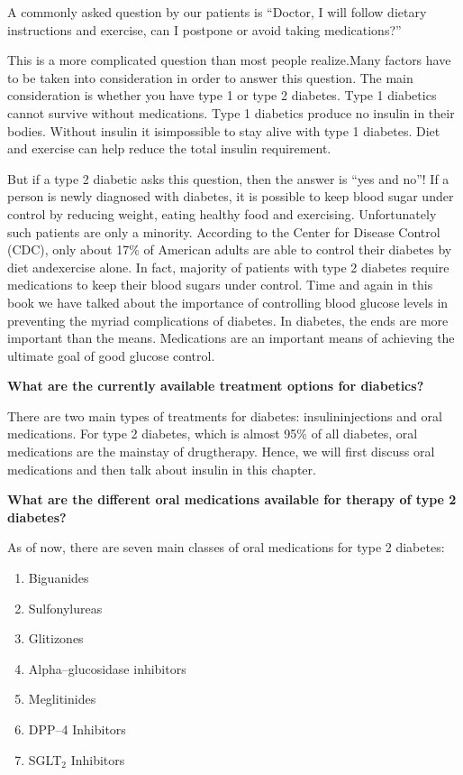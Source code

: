 A commonly asked question by our patients is “Doctor, I will follow dietary instructions and exercise, can I postpone or avoid taking medi\-cations?”

This is a more complicated question than most people realize.\break Many factors have to be taken into consideration in order to answer this question. The main consideration is whether you have type 1 or type 2 diabetes. Type 1 diabetics cannot survive without medications. Type 1 diabetics produce no insulin in their bodies. Without insulin it is\break impossible to stay alive with type 1 diabetes. Diet and exercise can help reduce the total insulin requirement.

But if a type 2 diabetic asks this question, then the answer is “yes and no”! If a person is newly diagnosed with diabetes, it is possible to keep blood sugar under control by reducing weight, eating healthy food and exercising. Unfortunately such patients are only a mino\-rity. According to the Center for Disease Control (CDC), only about 17\% of American adults are able to control their diabetes by diet and\break exercise alone. In fact, majority of patients with type 2 diabetes require medications to keep their blood sugars under control. Time and again in this book we have talked about the importance of controlling blood glucose levels in preventing the myriad complications of diabetes. In diabetes, the ends are more important than the means. Medications are an important means of achieving the ultimate goal of good glucose control.

\clearpage

\noindent\textbf{What are the currently available treatment options for diabetics?}

There are two main types of treatments for diabetes: insulin\break injections and oral medications. For type 2 diabetes, which is almost 95\% of all diabetes, oral medications are the mainstay of drug\break therapy. Hence, we will first discuss oral medications and then talk about insulin in this chapter.

\vskip 6pt

\noindent\textbf{What are the different oral medications available for therapy of type 2 diabetes?}

As of now, there are seven main classes of oral medications for type 2 diabetes:

\vspace{-\topsep}
\begin{enumerate}[•]
\itemsep=0pt
\item Biguanides
\item Sulfonylureas
\item Glitizones
\item Alpha–glucosidase inhibitors
\item Meglitinides
\item DPP–4 Inhibitors
\item SGLT$_{\text{2}}$ Inhibitors
\end{enumerate}
\vspace{-\topsep}

